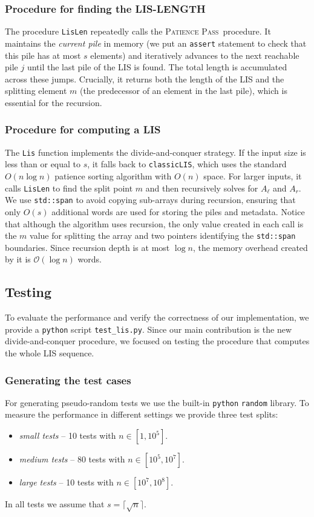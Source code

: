 \documentclass[lic, english, shortabstract]{iithesis}
\theoremstyle{plain}
\newcommand{\Lis}{\textsc{LIS}}
\newcommand{\LisLen}{\textsc{LIS-LENGTH}}
\newcommand{\Ppass}{\textsc{Patience Pass}}
\theoremstyle{definition}
\begin{document}
\subsubsection{Procedure for finding the \LisLen}
The procedure \texttt{LisLen} repeatedly calls the \Ppass\ procedure.
It maintains the \textit{current pile} in memory (we put an \texttt{assert} statement to check that this pile has at most $s$ elements) and iteratively advances to the next reachable pile $j$ until the last pile of the LIS is found. 
The total length is accumulated across these jumps. 
Crucially, it returns both the length of the LIS and the splitting element $m$ (the predecessor of an element in the last pile), which is essential for the recursion.

\subsubsection{Procedure for computing a \Lis}
The \texttt{Lis} function implements the divide-and-conquer strategy. 
If the input size is less than or equal to $s$, it falls back to \texttt{classicLIS}, which uses the standard $O(n \log n)$ patience sorting algorithm with $O(n)$ space. 
For larger inputs, it calls \texttt{LisLen} to find the split point $m$ and then recursively solves for $A_\ell$ and $A_r$. 
We use \texttt{std::span} to avoid copying sub-arrays during recursion, ensuring that only $O(s)$ additional words are used for storing the piles and metadata.
Notice that although the algorithm uses recursion, the only value created in each call is the $m$ value for splitting the array and two pointers identifying the \texttt{std::span} boundaries.
Since recursion depth is at most $\log n$, the memory overhead created by it is $\mathcal{O}(\log n)$ words.

\subsection{Testing}

To evaluate the performance and verify the correctness of our implementation, we provide a \texttt{python} script \texttt{test\_lis.py}.
Since our main contribution is the new divide-and-conquer procedure, we focused on testing the procedure that computes the whole LIS sequence.
\subsubsection{Generating the test cases}
For generating pseudo-random tests we use the built-in \texttt{python} \texttt{random} library. 
To measure the performance in different settings we provide three test splits:
\begin{itemize}
    \item \textit{small tests} -- 10 tests with $n \in [1, 10^5]$.
    \item \textit{medium tests} -- 80 tests with $n \in [10^5, 10^7]$.
    \item \textit{large tests} -- 10 tests with $n \in [10^7, 10^8]$.
\end{itemize}
In all tests we assume that $s = \lceil \sqrt{n} \rceil$.
\end{document}
